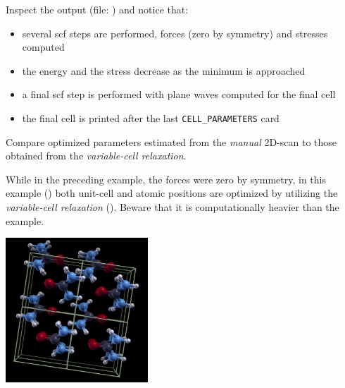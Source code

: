 \documentclass[landscape]{foils}
\begin{document}
Inspect the output (file: ) and notice that:
\vspace{-1em}
\begin{itemize}
  \item several scf steps are performed, forces (zero by symmetry) 
    and stresses computed
    \vspace{-1em}
  \item the energy and the stress decrease as the minimum is approached
    \vspace{-1em}
  \item a final scf step is performed with plane waves computed for
    the final cell
    \vspace{-1em}
  \item the final cell is printed after the last \texttt{CELL\_PARAMETERS}
    card
  \end{itemize}
  Compare optimized parameters estimated from the {\em manual} 2D-scan
  to those obtained from the  {\em variable-cell relaxation}.


While in the preceding example, the forces were zero by symmetry, in
this example () both unit-cell and atomic
positions are optimized by utilizing the {\em variable-cell
  relaxation} ().  Beware that it is
computationally heavier than the  example.

\begin{center}
  \includegraphics[width=0.4\textwidth]{figs/urea.png}
\end{center}

%

\end{document}
